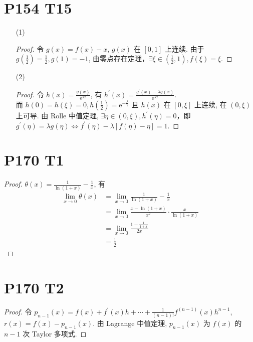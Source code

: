 \documentclass{article}
\newcommand{\ds}{^\prime}
\begin{document}
\section*{P154 T15}

\begin{itemize}
    \item [(1)]
    \begin{proof}
        令 $g(x) = f(x) - x$, $g(x)$ 在 $[0, 1]$ 上连续. 由于 $g\left(\frac{1}{2}\right) = \frac{1}{2}, g(1) = -1$, 由零点存在定理，$\exists \xi \in \left(\frac{1}{2}, 1\right), f(\xi) = \xi$.
    \end{proof}
    \item [(2)]
    \begin{proof}
        令 $h(x) = \frac{g(x)}{\mathrm{e}^{\lambda x}}$, 有 $h\ds(x) = \frac{g\ds(x) - \lambda g(x)}{\mathrm{e}^{\lambda x}}$. \\
        而 $h(0) = h(\xi) = 0, h\left(\frac{1}{2}\right) = \mathrm{e}^{-\frac{\lambda}{2}}$ 且 $h(x)$ 在 $[0, \xi]$ 上连续, 在 $(0, \xi)$ 上可导. 由 Rolle 中值定理, $\exists \eta \in (0, \xi), h\ds(\eta) = 0$，即 $g\ds(\eta) = \lambda g(\eta) \Leftrightarrow f\ds(\eta) - \lambda [f(\eta) - \eta] = 1$.
    \end{proof}
\end{itemize}

\section*{P170 T1}

\begin{proof}
    $\theta(x) = \frac{1}{\ln(1 + x)} - \frac{1}{x}$, 有
    \begin{align*}
        \lim_{x \to 0}\theta(x) & = \lim_{x \to 0}\frac{1}{\ln(1 + x)} - \frac{1}{x} \\
        & = \lim_{x \to 0}\frac{x - \ln (1 + x)}{x^2}\cdot \frac{x}{\ln(1 + x)} \\
        & = \lim_{x \to 0}\frac{1 - \frac{1}{1 + x}}{2x} \\
        & = \frac{1}{2}
    \end{align*}
\end{proof}

\section*{P170 T2}

\begin{proof}
    令 $p_{n - 1}(x) = f(x) + f\ds(x)h + \cdots + \frac{1}{(n - 1)!}f^{(n - 1)}(x)h^{n - 1}$, $r(x) = f(x) - p_{n - 1}(x)$. 由 Lagrange 中值定理, $p_{n - 1}(x)$ 为 $f(x)$ 的 $n - 1$ 次 Taylor 多项式.
\end{proof}
\end{document}
